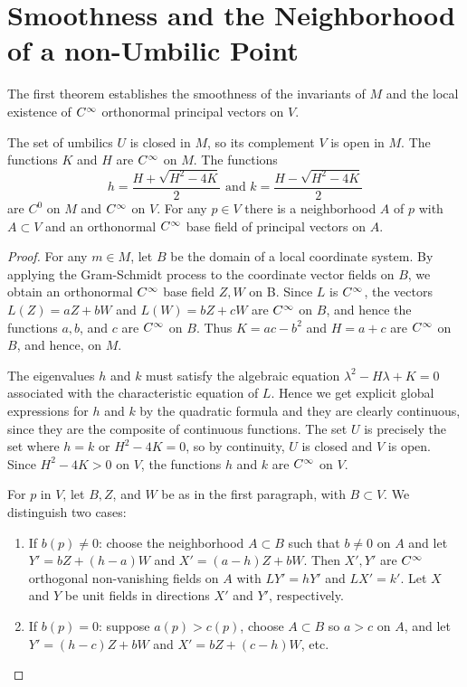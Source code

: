 \documentclass[../main]{subfiles}
\begin{document}
\section{Smoothness and the Neighborhood of a non-Umbilic Point}\label{ch03:s1}


The first theorem establishes the smoothness of the invariants of $M$ and the local existence of $C^\infty$ orthonormal principal vectors on $V$.



\begin{theorem} \label{thm:ch3.1.1}
 The set of umbilics $U$ is closed in $M$, so its complement $V$ is open in $M$. The functions $K$ and $H$ are $C^\infty$ on $M$. The functions \[h=\dfrac{H+\sqrt{H^{2}-4 K}}{2} \text{ and } k=\dfrac{H-\sqrt{H^{2}-4 K}}{2}\] are $C^{0}$ on $M$ and $C^\infty$ on $V$. For any $p \in V$ there is a neighborhood $A$ of $p$ with $A \subset V$ and an orthonormal $C^\infty$ base field of principal vectors on $A .$
\end{theorem}

\begin{proof}

 For any $m\in M$, let $B$ be the domain of a local coordinate system. By applying the Gram-Schmidt process to the coordinate vector fields on $B$, we obtain an orthonormal $C^\infty$ base field $Z, W$ on B. Since $L$ is $C^\infty$, the vectors $L(Z)=a Z+b W$ and $L(W)=b Z+c W$ are $C^\infty$ on $B$, and hence the functions $a, b$, and $c$ are $C^\infty$ on $B$. Thus $K=a c-b^{2}$ and $H=a+c$ are $C^\infty$ on $B$, and hence, on $M$.
 
 The eigenvalues $h$ and $k$ must satisfy the algebraic equation $\lambda^{2}-H \lambda+K=0$ associated with the characteristic equation of $L$. Hence we get explicit global expressions for $h$ and $k$ by the quadratic formula and they are clearly continuous, since they are the composite of continuous functions. The set $U$ is precisely the set where $h=k$ or $H^{2}-4 K=0$, so by continuity, $U$ is closed and $V$ is open. Since $H^{2}-4 K>0$ on $V$, the functions $h$ and $k$ are $C^\infty$ on $V$.

For $p$ in $V$, let $B, Z$, and $W$ be as in the first paragraph, with $B \subset V .$ We distinguish two cases: 
\begin{enumerate}
    \item If $b(p) \neq 0$: choose the neighborhood $A \subset B$ such that $b \neq 0$ on $A$ and let $Y'=b Z+(h-a) W$ and $X'=(a-h) Z+b W$. Then $X', Y'$ are $C^\infty$ orthogonal non-vanishing fields on $A$ with $L Y'=h Y'$ and $L X'=k'$. Let $X$ and $Y$ be unit fields in directions $X'$ and $Y'$, respectively.
    \item If $b(p)=0$: suppose $a(p)>c(p)$, choose $A \subset B$ so $a>c$ on $A$, and let $Y'=(h-c) Z+b W$ and $X'=b Z+(c-h) W$, etc.
\end{enumerate}

\end{proof}
\end{document}

